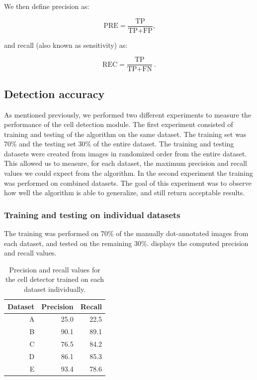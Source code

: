 	We then define precision as:
	
	\[
		\text{PRE} = \frac{\text{TP}}{\text{TP}+\text{FP}}\text{,}
	\]
	
	\noindent and recall (also known as sensitivity) as:
	
	\[
		\text{REC} = \frac{\text{TP}}{\text{TP} + \text{FN}}\ \text{.}
	\]
	
	\subsection{Detection accuracy}
			
		As mentioned previously, we performed two different experiments to measure the performance of the cell detection module. The first experiment consisted of training and testing of the algorithm on the same dataset. The training set was 70\% and the testing set 30\% of the entire dataset. The training and testing datasets were created from images in randomized order from the entire dataset. This allowed us to measure, for each dataset, the maximum precision and recall values we could expect from the algorithm. In the second experiment the training was performed on combined datasets. The goal of this experiment was to observe how well the algorithm is able to generalize, and still return acceptable results.
		
		\subsubsection{Training and testing on individual datasets}
		
		The training was performed on 70\% of the manually dot-annotated images from each dataset, and tested on the remaining 30\%.  displays the computed precision and recall values.
		
		
		\begin{table}[h]
			\centering
			\begin{tabular}{rrr}
				Dataset & Precision & Recall \\
				\hline
				      A &      25.0 &   22.5 \\
				      B &      90.1 &   89.1 \\
				      C &      76.5 &   84.2 \\
				      D &      86.1 &   85.3 \\
				      E &      93.4 &   78.6
			\end{tabular} 
			\caption{Precision and recall values for the cell detector trained on each dataset individually.}
			\label{tab:results_detector_individual}
		\end{table}
		
